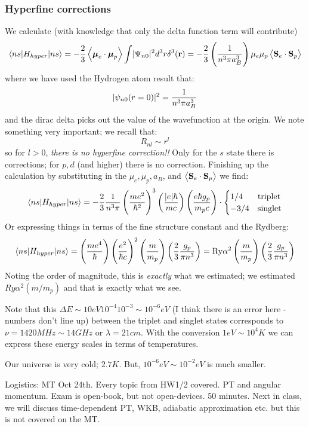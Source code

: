 \subsubsection{Hyperfine corrections}
We calculate (with knowledge that only the delta function term will contribute)
\begin{equation}
    \bra{ns}H_{hyper}\ket{ns} = -\frac{2}{3}\avg{\gv{\mu}_e\cdot\gv{\mu}_p}\int\abs{\Psi_{n0}}^2 d^3r \delta^3(\v{r}) = -\frac{2}{3}\left(\frac{1}{n^3\pi a_B^3}\right)\mu_e\mu_p\avg{\v{S}_e \cdot \v{S}_p}
\end{equation}
where we have used the Hydrogen atom result that:
\begin{equation}
    \abs{\psi_{n0}(r=0)}^2 = \frac{1}{n^3\pi a_B^3}
\end{equation}
and the dirac delta picks out the value of the wavefunction at the origin. We note something very important; we recall that:
\begin{equation}
    R_{nl} \sim r^l
\end{equation}
so for $l > 0$, \emph{there is no hyperfine correction!!} Only for the $s$ state there is corrections; for $p, d$ (and higher) there is no correction. Finishing up the calculation by substituting in the $\mu_e, \mu_p, a_B$, and $\avg{\v{S}_e \cdot \v{S}_p}$ we find:
\begin{equation}
    \bra{ns}H_{hyper}\ket{ns} = -\frac{2}{3}\frac{1}{n^3\pi}\left(\frac{me^2}{\hbar^2}\right)^3\left(\frac{\abs{e}\hbar}{mc}\right)\left(\frac{e\hbar g_p}{m_p c}\right) \cdot \begin{cases}
        1/4 & \text{triplet}
        \\ -3/4 & \text{singlet}
    \end{cases}
\end{equation}
Or expressing things in terms of the fine structure constant and the Rydberg:
\begin{equation}
    \bra{ns}H_{hyper}\ket{ns} = \left(\frac{me^4}{\hbar}\right)\left(\frac{e^2}{\hbar c}\right)^2 \left(\frac{m}{m_p}\right)\left(\frac{2}{3}\frac{g_p}{\pi n^3}\right) = \si{Ry}\alpha^2 \left(\frac{m}{m_p}\right)\left(\frac{2}{3}\frac{g_p}{\pi n^3}\right)
\end{equation}
Noting the order of magnitude, this is \emph{exactly} what we estimated; we estimated $\si{Ry}\alpha^2 (m/m_p)$ and that is exactly what we see.

Note that this $\Delta E \sim 10\si{eV}10^{-4}10^{-3} \sim 10^{-6}\si{eV}$ (I think there is an error here - numbers don't line up) between the triplet and singlet states corresponds to $\nu = 1420\si{MHz} \sim 14\si{GHz}$ or $\lambda = 21\si{cm}$. With the conversion $1\si{eV}\sim 10^4\si{K}$ we can express these energy scales in terms of temperatures.

Our universe is very cold; $2.7\si{K}$. But, $10^{-6}\si{eV} \sim 10^{-2}\si{eV}$ is much smaller. 

Logistics: MT Oct 24th. Every topic from HW1/2 covered. PT and angular momentum. Exam is open-book, but not open-devices. 50 minutes. Next in class, we will discuss time-dependent PT, WKB, adiabatic approximation etc. but this is not covered on the MT.